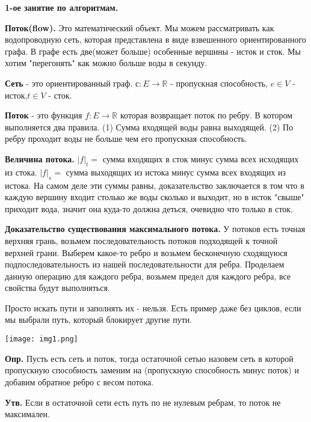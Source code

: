  \begin{center}
  \textbf{1-ое занятие по алгоритмам.} 
 \end{center}

 \textbf{Поток(flow).} Это математический объект. Мы можем рассматривать как водопроводную сеть, которая представлена в виде взвешенного ориентированного графа. В графе есть две(может больше) особенные вершины - исток и сток. Мы хотим "перегонять" как можно больше воды в секунду.

 \textbf{Сеть} - это ориентированный граф. $с: E \to \mathbb{R} $ - пропускная способность, $e \in V$ - исток,\break$t \in V$ - сток.

  \textbf{Поток} - это функция $f: E \to \mathbb{R} $ которая возвращает поток по ребру. В котором выполняется два правила. (1) Сумма входящей воды равна выходящей. (2) По ребру проходит воды не больше чем его пропускная способность.

  \textbf{Величина потока.} $|f|_t = $ сумма входящих в сток минус сумма всех исходящих из стока.  $|f|_s = $ сумма выходящих из истока минус сумма всех входящих из истока. На самом деле эти суммы равны, доказательство заключается в том что в каждую вершину входит столько же воды сколько и выходит, но в исток "свыше" приходит вода, значит она куда-то должна деться, очевидно что только в сток.

\textbf{Доказательство существования максимального потока.} У потоков есть точная верхняя грань, возьмем последовательность потоков подходящей к точной верхней грани. Выберем какое-то ребро и возьмем бесконечную сходящуюся подпоследовательность из нашей последовательности для ребра. Проделаем данную операцию для каждого ребра, возьмем предел для каждого ребра, все свойства будут выполняться.

Просто искать пути и заполнять их - нельзя. Есть пример даже без циклов, если мы выбрали путь, который блокирует другие пути.

\begin{center}
\texttt{[image: img1.png]}
\end{center}

\textbf{Опр.} Пусть есть сеть и поток, тогда остаточной сетью назовем сеть в которой пропускную способность заменим на (пропускную способность минус поток) и добавим обратное ребро с весом потока.

\textbf{Утв.} Если в остаточной сети есть путь по не нулевым ребрам, то поток не максимален.
